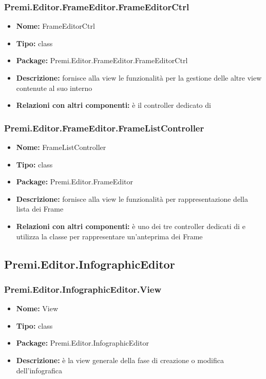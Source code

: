 \subsubsection{Premi.Editor.FrameEditor.FrameEditorCtrl}
\begin{itemize}
  \item \textbf{Nome:} FrameEditorCtrl
  \item \textbf{Tipo:} class
  \item \textbf{Package:} Premi.Editor.FrameEditor.FrameEditorCtrl
  \item \textbf{Descrizione:} fornisce alla view le funzionalità per la gestione delle altre view contenute al suo interno
  \item \textbf{Relazioni con altri componenti:} è il controller dedicato di   
\end{itemize}
\subsubsection{Premi.Editor.FrameEditor.FrameListController}
\begin{itemize}
  \item \textbf{Nome:} FrameListController
  \item \textbf{Tipo:} class
  \item \textbf{Package:} Premi.Editor.FrameEditor
  \item \textbf{Descrizione:} fornisce alla view  le funzionalità per rappresentazione della lista dei Frame
  \item \textbf{Relazioni con altri componenti:} è uno dei tre controller dedicati di    e utilizza la classe  per rappresentare un'anteprima dei Frame
\end{itemize}

\subsection{Premi.Editor.InfographicEditor}
\subsubsection{Premi.Editor.InfographicEditor.View}
\begin{itemize}
  \item \textbf{Nome:} View
  \item \textbf{Tipo:} class
  \item \textbf{Package:} Premi.Editor.InfographicEditor
  \item \textbf{Descrizione:}  è la view generale della fase di creazione o modifica dell'infografica
\end{itemize}

